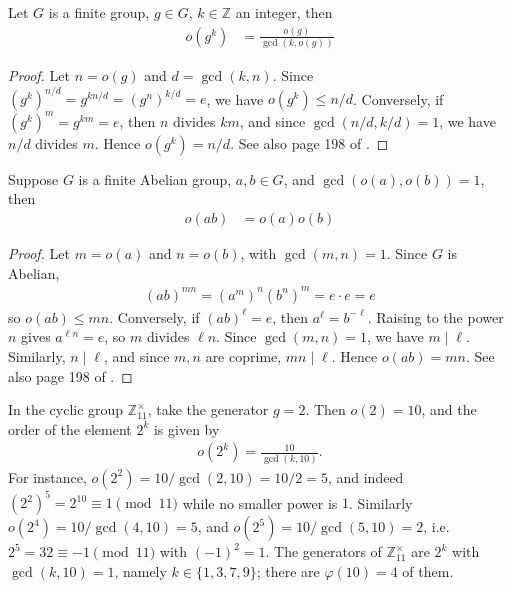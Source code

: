 \documentclass[a4paper, 12pt]{book} %
\begin{document}
\begin{proposition}
    Let $G$ is a finite group, $g \in G$, $k \in \mathbb{Z}$ an integer, then
    \begin{align}
        o(g^k) &= \frac{o(g)}{\gcd(k, o(g))}
    \end{align}
\end{proposition}
\begin{proof}
    Let $n = o(g)$ and $d = \gcd(k, n)$. Since $(g^k)^{n/d} = g^{kn/d} = (g^n)^{k/d} = e$, we have $o(g^k) \leq n/d$. Conversely, if $(g^k)^m = g^{km} = e$, then $n$ divides $km$, and since $\gcd(n/d, k/d) = 1$, we have $n/d$ divides $m$. Hence $o(g^k) = n/d$. See also page 198 of \cite{zheng2022modern}.
\end{proof}

\begin{proposition}
    Suppose $G$ is a finite Abelian group, $a,b \in G$, and $\gcd(o(a), o(b)) = 1$, then
    \begin{align}
        o(ab) &= o(a) o(b)
    \end{align}
\end{proposition}
\begin{proof}
    Let $m = o(a)$ and $n = o(b)$, with $\gcd(m, n) = 1$. Since $G$ is Abelian,
    \begin{align}
        (ab)^{mn} = (a^m)^n (b^n)^m = e \cdot e = e
    \end{align}
    so $o(ab) \leq mn$. Conversely, if $(ab)^\ell = e$, then $a^\ell = b^{-\ell}$. Raising to the power $n$ gives $a^{\ell n} = e$, so $m$ divides $\ell n$. Since $\gcd(m, n) = 1$, we have $m \mid \ell$. Similarly, $n \mid \ell$, and since $m, n$ are coprime, $mn \mid \ell$.     Hence $o(ab) = mn$. See also page 198 of \cite{zheng2022modern}.
\end{proof}

\begin{example}
    In the cyclic group $\mathbb{Z}_{11}^\times$, take the generator $g = 2$. Then $o(2) = 10$, and the order of the element $2^k$ is given by
    \begin{align}
        o(2^k) = \frac{10}{\gcd(k, 10)}.
    \end{align}
    For instance, $o(2^2) = 10/\gcd(2,10) = 10/2 = 5$, and indeed $(2^2)^5 = 2^{10} \equiv 1 \pmod{11}$ while no smaller power is $1$. Similarly $o(2^4) = 10/\gcd(4,10) = 5$, and $o(2^5) = 10/\gcd(5,10) = 2$, i.e.\ $2^5 = 32 \equiv -1 \pmod{11}$ with $(-1)^2 = 1$. The generators of $\mathbb{Z}_{11}^\times$ are $2^k$ with $\gcd(k,10) = 1$, namely $k \in \{1,3,7,9\}$; there are $\varphi(10) = 4$ of them.
\end{example}
\end{document}
